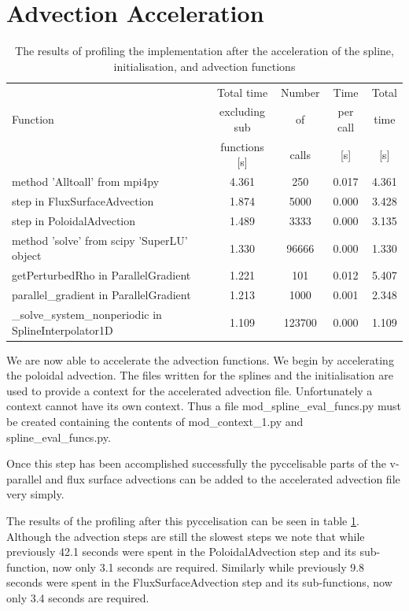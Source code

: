 \section{Advection Acceleration}

\begin{table}[ht]
\centering
 \begin{tabular}{|m{}|c|c|c|c|}
  \hline
          & Total time & Number & Time & Total \\
  Function & excluding sub & of & per call & time \\
          & functions [s] & calls & [s] & [s] \\
  \hline
  \hline
  method 'Alltoall' from mpi4py & 4.361 & 250 & 0.017 & 4.361 \\
  \hline
  step in FluxSurfaceAdvection & 1.874 & 5000 & 0.000 & 3.428 \\
  \hline
  step in PoloidalAdvection & 1.489 & 3333 & 0.000 & 3.135\\
  \hline
  method 'solve' from scipy 'SuperLU' object & 1.330 & 96666 & 0.000 & 1.330\\
  \hline
  getPerturbedRho in ParallelGradient & 1.221 & 101 & 0.012 & 5.407\\
  \hline
  parallel\_gradient in ParallelGradient & 1.213 & 1000 & 0.001 & 2.348\\
  \hline
  \_solve\_system\_nonperiodic in SplineInterpolator1D & 1.109 & 123700 & 0.000 & 1.109\\
  \hline
 \end{tabular}
 \caption{\label{tab::adv profile} The results of profiling the implementation after the acceleration of the spline, initialisation, and advection functions}
\end{table}

We are now able to accelerate the advection functions. We begin by accelerating the poloidal advection. The files written for the splines and the initialisation are used to provide a context for the accelerated advection file. Unfortunately a context cannot have its own context. Thus a file mod\_spline\_eval\_funcs.py must be created containing the contents of mod\_context\_1.py and spline\_eval\_funcs.py.

Once this step has been accomplished successfully the pyccelisable parts of the v-parallel and flux surface advections can be added to the accelerated advection file very simply.

The results of the profiling after this pyccelisation can be seen in table \ref{tab::adv profile}. Although the advection steps are still the slowest steps we note that while previously 42.1 seconds were spent in the PoloidalAdvection step and its sub-function, now only 3.1 seconds are required. Similarly while previously 9.8 seconds were spent in the FluxSurfaceAdvection step and its sub-functions, now only 3.4 seconds are required.

